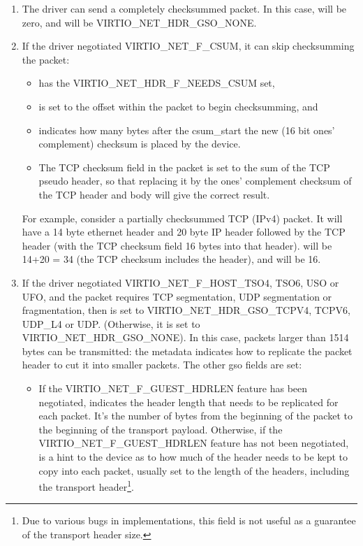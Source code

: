 \begin{enumerate}
\item The driver can send a completely checksummed packet.  In this case,
   will be zero, and  will be VIRTIO_NET_HDR_GSO_NONE.

\item If the driver negotiated VIRTIO_NET_F_CSUM, it can skip
  checksumming the packet:
  \begin{itemize}
  \item {} has the VIRTIO_NET_HDR_F_NEEDS_CSUM set,

  \item {} is set to the offset within the packet to begin checksumming,
    and

  \item {} indicates how many bytes after the csum_start the
    new (16 bit ones' complement) checksum is placed by the device.

  \item The TCP checksum field in the packet is set to the sum
    of the TCP pseudo header, so that replacing it by the ones'
    complement checksum of the TCP header and body will give the
    correct result.
  \end{itemize}

\begin{note}
For example, consider a partially checksummed TCP (IPv4) packet.
It will have a 14 byte ethernet header and 20 byte IP header
followed by the TCP header (with the TCP checksum field 16 bytes
into that header).  will be 14+20 = 34 (the TCP
checksum includes the header), and  will be 16.
\end{note}

\item If the driver negotiated
  VIRTIO_NET_F_HOST_TSO4, TSO6, USO or UFO, and the packet requires
  TCP segmentation, UDP segmentation or fragmentation, then 
  is set to VIRTIO_NET_HDR_GSO_TCPV4, TCPV6, UDP_L4 or UDP.
  (Otherwise, it is set to VIRTIO_NET_HDR_GSO_NONE). In this
  case, packets larger than 1514 bytes can be transmitted: the
  metadata indicates how to replicate the packet header to cut it
  into smaller packets. The other gso fields are set:

  \begin{itemize}
  \item If the VIRTIO_NET_F_GUEST_HDRLEN feature has been negotiated,
     indicates the header length that needs to be replicated
    for each packet. It's the number of bytes from the beginning of the packet
    to the beginning of the transport payload.
    Otherwise, if the VIRTIO_NET_F_GUEST_HDRLEN feature has not been negotiated,
     is a hint to the device as to how much of the header
    needs to be kept to copy into each packet, usually set to the
    length of the headers, including the transport header\footnote{Due to various bugs in implementations, this field is not useful
as a guarantee of the transport header size.
}.


\end{itemize}
\end{enumerate}
